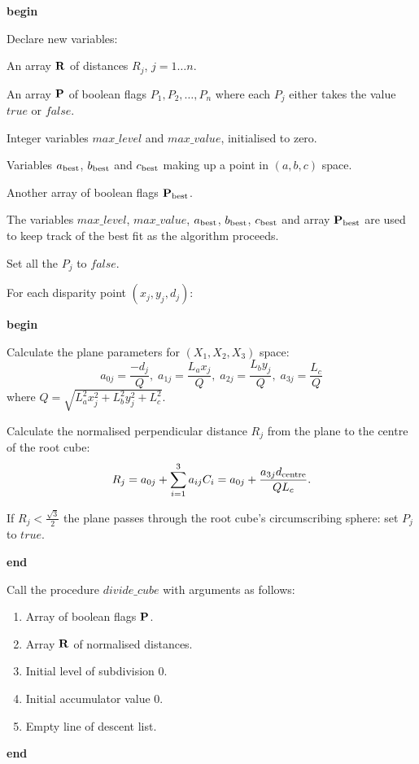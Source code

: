   {\bf begin}
  \begin{indent_para}
     Declare new variables:
     \begin{indent_para}
      An array ${\bf R}$ of distances $R_j$, $j=1 \ldots n$.

      An array ${\bf P}$ of boolean flags $P_1, P_2,\ldots,P_n$ where each
      $P_j$ either takes the value $true$ or $false$.

      Integer variables $max\_level$ and $max\_value$, initialised to zero.

      Variables $a_{\rm best}$, $b_{\rm best}$ and $c_{\rm best}$
      making up a point in $(a,b,c)$ space.

      Another array of boolean flags ${\bf P}_{\rm best}$.
     \end{indent_para}

     The variables $max\_level$, $max\_value$, $a_{\rm best}$, $b_{\rm best}$,
     $c_{\rm best}$ and array ${\bf P}_{\rm best}$ are used to keep track
     of the best fit as the algorithm proceeds.

     Set all the $P_j$ to $false$.

     For each disparity point $(x_j , y_j , d_j )$:

     {\bf begin}
     \begin{indent_para}
      Calculate the plane parameters for $(X_1 , X_2 , X_3 )$ space:
      \begin{displaymath}
	   a_{0j} = \frac{-d_j}{Q} ,\;
	   a_{1j} = \frac{L_a x_j}{Q} ,\;
	   a_{2j} = \frac{L_b y_j}{Q} ,\;
	   a_{3j} = \frac{L_c}{Q}
      \end{displaymath}
      where $Q = \sqrt{L_a^2 x_j^2 + L_b^2 y_j^2 + L_c^2}$.

      Calculate the normalised perpendicular distance $R_j$
      from the plane to the centre of the root cube:
      \begin{displaymath}
 	   R_j = a_{0j} + \sum_{i=1}^3 a_{ij} C_i
	   = a_{0j} + \frac{a_{3j} d_{\rm centre}}{Q L_c}.
      \end{displaymath}

      If $R_j < \frac{\sqrt{3}}{2}$ the plane passes through
      the root cube's circumscribing sphere: set $P_j$ to $true$.
     \end{indent_para}
     {\bf end}

     Call the procedure $divide\_cube$ with arguments as follows:
     \begin{enumerate}
            \item Array of boolean flags ${\bf P}$.

	    \item Array ${\bf R}$ of normalised distances.

	    \item Initial level of subdivision 0.

	    \item Initial accumulator value 0.

	    \item Empty line of descent list.
     \end{enumerate}
  \end{indent_para}
  {\bf end}

